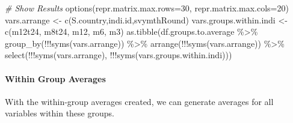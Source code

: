 \documentclass[
]{book}
\newenvironment{Shaded}{\begin{snugshade}}{\end{snugshade}}
\newcommand{\AttributeTok}[1]{\textcolor[rgb]{0.77,0.63,0.00}{#1}}
\newcommand{\CommentTok}[1]{\textcolor[rgb]{0.56,0.35,0.01}{\textit{#1}}}
\newcommand{\DecValTok}[1]{\textcolor[rgb]{0.00,0.00,0.81}{#1}}
\newcommand{\FunctionTok}[1]{\textcolor[rgb]{0.00,0.00,0.00}{#1}}
\newcommand{\NormalTok}[1]{#1}
\newcommand{\OtherTok}[1]{\textcolor[rgb]{0.56,0.35,0.01}{#1}}
\newcommand{\SpecialCharTok}[1]{\textcolor[rgb]{0.00,0.00,0.00}{#1}}
\newcommand{\StringTok}[1]{\textcolor[rgb]{0.31,0.60,0.02}{#1}}
\begin{document}
\begin{Shaded}
\begin{Highlighting}[]
\CommentTok{\# Show Results}
\FunctionTok{options}\NormalTok{(}\AttributeTok{repr.matrix.max.rows=}\DecValTok{30}\NormalTok{, }\AttributeTok{repr.matrix.max.cols=}\DecValTok{20}\NormalTok{)}
\NormalTok{vars.arrange }\OtherTok{\textless{}{-}} \FunctionTok{c}\NormalTok{(}\StringTok{\textquotesingle{}S.country\textquotesingle{}}\NormalTok{,}\StringTok{\textquotesingle{}indi.id\textquotesingle{}}\NormalTok{,}\StringTok{\textquotesingle{}svymthRound\textquotesingle{}}\NormalTok{)}
\NormalTok{vars.groups.within.indi }\OtherTok{\textless{}{-}} \FunctionTok{c}\NormalTok{(}\StringTok{\textquotesingle{}m12t24\textquotesingle{}}\NormalTok{, }\StringTok{\textquotesingle{}m8t24\textquotesingle{}}\NormalTok{, }\StringTok{\textquotesingle{}m12\textquotesingle{}}\NormalTok{, }\StringTok{\textquotesingle{}m6\textquotesingle{}}\NormalTok{, }\StringTok{\textquotesingle{}m3\textquotesingle{}}\NormalTok{)}
\FunctionTok{as.tibble}\NormalTok{(df.groups.to.average }\SpecialCharTok{\%\textgreater{}\%}
          \FunctionTok{group\_by}\NormalTok{(}\SpecialCharTok{!!!}\FunctionTok{syms}\NormalTok{(vars.arrange)) }\SpecialCharTok{\%\textgreater{}\%}
          \FunctionTok{arrange}\NormalTok{(}\SpecialCharTok{!!!}\FunctionTok{syms}\NormalTok{(vars.arrange)) }\SpecialCharTok{\%\textgreater{}\%}
          \FunctionTok{select}\NormalTok{(}\SpecialCharTok{!!!}\FunctionTok{syms}\NormalTok{(vars.arrange), }\SpecialCharTok{!!!}\FunctionTok{syms}\NormalTok{(vars.groups.within.indi)))}
\end{Highlighting}
\end{Shaded}

\hypertarget{within-group-averages}{%
\paragraph{Within Group Averages}\label{within-group-averages}}

With the within-group averages created, we can generate averages for all variables within these groups.
\end{document}
